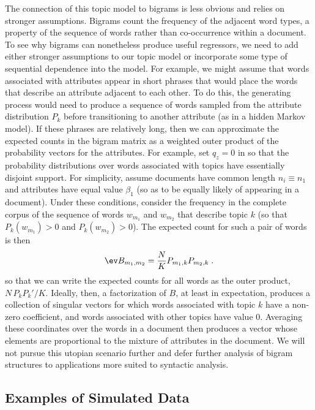 \documentclass[12pt]{article}
\begin{document}
The connection of this topic model to bigrams is less obvious and relies on stronger assumptions.  Bigrams count the frequency of the adjacent word types, a property of the sequence of words rather than co-occurrence within a document.  To see why bigrams can nonetheless produce useful regressors, we need to add either stronger assumptions to our topic model or incorporate some type of sequential dependence into the model.  For example, we might assume that words associated with attributes appear in short phrases that would place the words that describe an attribute adjacent to each other.   To do this, the generating process would need to produce a sequence of words sampled from the attribute distribution $P_k$ before transitioning to another attribute (as in a hidden Markov model).  If these phrases are relatively long, then we can approximate the expected counts in the bigram matrix as a weighted outer product of the probability vectors for the attributes.  For example, set $q_z = 0$ in  so that the probability distributions over words associated with topics have essentially disjoint support.  For simplicity, assume documents have common length $n_i \equiv n_1$ and attributes have equal value $\beta_1$ (so as to be equally likely of appearing in a document). Under these conditions, consider the frequency in the complete corpus of the sequence of words $w_{m_1}$ and $w_{m_2}$ that describe topic $k$ (so that $P_k(w_{m_1}) > 0$ and $P_k(w_{m_2}) > 0$).  The expected count for such a pair of words is then
 \begin{equation}
  \ev B_{m_1,m_2} = \frac{N}{K} P_{m_1,k} P_{m_2,k}  \;.
  \label{eq:Pwm}
\end{equation}
so that we can  write the expected counts for all words as the outer product, $N\,P_k P_k'/K$.  Ideally, then, a factorization of $B$, at least in expectation, produces a collection of singular vectors for which words associated with topic $k$ have a non-zero coefficient, and words associated with other topics have value 0. Averaging these coordinates over the words in a document then produces a vector whose elements are proportional to the mixture of attributes in the document.  We will not pursue this utopian scenario further and defer further analysis of bigram structures to applications more suited to syntactic analysis.


\subsection{Examples of Simulated Data}
\end{document}

